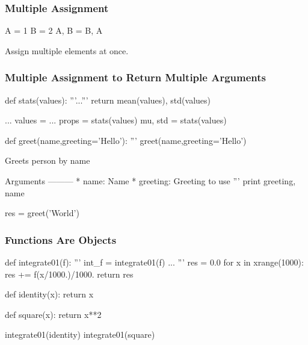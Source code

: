 \begin{frame}[fragile]
\frametitle{Multiple Assignment}

\begin{python}
A = 1
B = 2
A, B = B, A
\end{python}

Assign multiple elements at once.
\end{frame}

\begin{frame}[fragile]
\frametitle{Multiple Assignment to Return Multiple Arguments}

\begin{python}
def stats(values):
    '''...'''
    return mean(values), std(values)

...
values = ...
props = stats(values)
mu, std = stats(values)
\end{python}

\end{frame}

\begin{frame}[fragile]

\begin{python}
def greet(name,greeting='Hello'):
    '''
    greet(name,greeting='Hello')

    Greets person by name

    Arguments
    ---------
        * name: Name
        * greeting: Greeting to use
    '''
    print greeting, name

res = greet('World')

\end{python}

\end{frame}

\begin{frame}[fragile]
\frametitle{Functions Are Objects}

\begin{python}

def integrate01(f):
    '''
    int_f = integrate01(f)
    ...
    '''
    res = 0.0
    for x in xrange(1000):
        res += f(x/1000.)/1000.
    return res

def identity(x):
    return x

def square(x):
    return x**2

integrate01(identity)
integrate01(square)
\end{python}

\end{frame}

